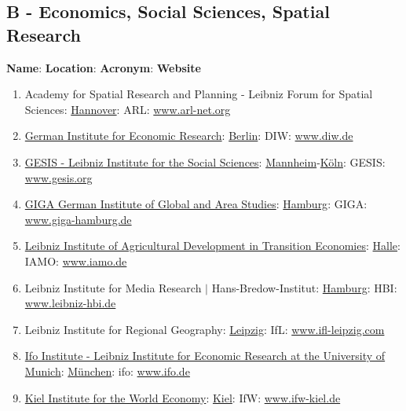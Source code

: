 \documentclass{book}
\numberwithin{equation}{section}
\begin{document}
\subsection{B - Economics, Social Sciences, Spatial Research}
\textbf{Name}: \textbf{Location}: \textbf{Acronym}: \textbf{Website}
\begin{enumerate}
    \item Academy for Spatial Research and Planning - Leibniz Forum for Spatial Sciences: \href{https://en.wikipedia.org/wiki/Hannover}{Hannover}: ARL: \url{www.arl-net.org}
    \item \href{https://en.wikipedia.org/wiki/German_Institute_for_Economic_Research}{German Institute for Economic Research}: \href{https://en.wikipedia.org/wiki/Berlin}{Berlin}: DIW: \url{www.diw.de}
    \item \href{https://en.wikipedia.org/wiki/GESIS_%E2%80%93_Leibniz_Institute_for_the_Social_Sciences}{GESIS - Leibniz Institute for the Social Sciences}: \href{https://en.wikipedia.org/wiki/Mannheim}{Mannheim}-\href{https://en.wikipedia.org/wiki/K%C3%B6ln}{Köln}: GESIS: \url{www.gesis.org}
    \item \href{https://en.wikipedia.org/wiki/GIGA_German_Institute_of_Global_and_Area_Studies}{GIGA German Institute of Global and Area Studies}: \href{https://en.wikipedia.org/wiki/Hamburg}{Hamburg}: GIGA: \url{www.giga-hamburg.de}
    \item \href{https://en.wikipedia.org/wiki/Leibniz_Institute_of_Agricultural_Development_in_Transition_Economies}{Leibniz Institute of Agricultural Development in Transition Economies}: \href{https://en.wikipedia.org/wiki/Halle,_Saxony-Anhalt}{Halle}: IAMO: \url{www.iamo.de}
    \item Leibniz Institute for Media Research $|$ Hans-Bredow-Institut: \href{https://en.wikipedia.org/wiki/Hamburg}{Hamburg}: HBI: \url{www.leibniz-hbi.de}
    \item Leibniz Institute for Regional Geography: \href{https://en.wikipedia.org/wiki/Leipzig}{Leipzig}: IfL: \url{www.ifl-leipzig.com}
    \item \href{https://en.wikipedia.org/wiki/Ifo_Institut_f%C3%BCr_Wirtschaftsforschung}{Ifo Institute - Leibniz Institute for Economic Research at the University of Munich}: \href{https://en.wikipedia.org/wiki/M%C3%BCnchen}{München}: ifo: \url{www.ifo.de}
    \item \href{https://en.wikipedia.org/wiki/Kiel_Institute_for_the_World_Economy}{Kiel Institute for the World Economy}: \href{https://en.wikipedia.org/wiki/Kiel}{Kiel}: IfW: \url{www.ifw-kiel.de}

\end{enumerate}
\end{document}
